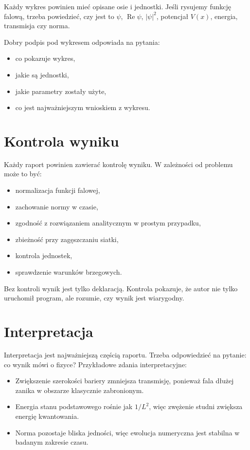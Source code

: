 Każdy wykres powinien mieć opisane osie i jednostki. Jeśli rysujemy funkcję falową, trzeba powiedzieć, czy jest to \(\psi\), \(\operatorname{Re}\psi\), \(|\psi|^2\), potencjał \(V(x)\), energia, transmisja czy norma.

Dobry podpis pod wykresem odpowiada na pytania:
\begin{itemize}
    \item co pokazuje wykres,
    \item jakie są jednostki,
    \item jakie parametry zostały użyte,
    \item co jest najważniejszym wnioskiem z wykresu.
\end{itemize}

\section{Kontrola wyniku}

Każdy raport powinien zawierać kontrolę wyniku. W zależności od problemu może to być:
\begin{itemize}
    \item normalizacja funkcji falowej,
    \item zachowanie normy w czasie,
    \item zgodność z rozwiązaniem analitycznym w prostym przypadku,
    \item zbieżność przy zagęszczaniu siatki,
    \item kontrola jednostek,
    \item sprawdzenie warunków brzegowych.
\end{itemize}

Bez kontroli wynik jest tylko deklaracją. Kontrola pokazuje, że autor nie tylko uruchomił program, ale rozumie, czy wynik jest wiarygodny.

\section{Interpretacja}

Interpretacja jest najważniejszą częścią raportu. Trzeba odpowiedzieć na pytanie: co wynik mówi o fizyce? Przykładowe zdania interpretacyjne:
\begin{itemize}
    \item Zwiększenie szerokości bariery zmniejsza transmisję, ponieważ fala dłużej zanika w obszarze klasycznie zabronionym.
    \item Energia stanu podstawowego rośnie jak \(1/L^2\), więc zwężenie studni zwiększa energię kwantowania.
    \item Norma pozostaje bliska jedności, więc ewolucja numeryczna jest stabilna w badanym zakresie czasu.
\end{itemize}

